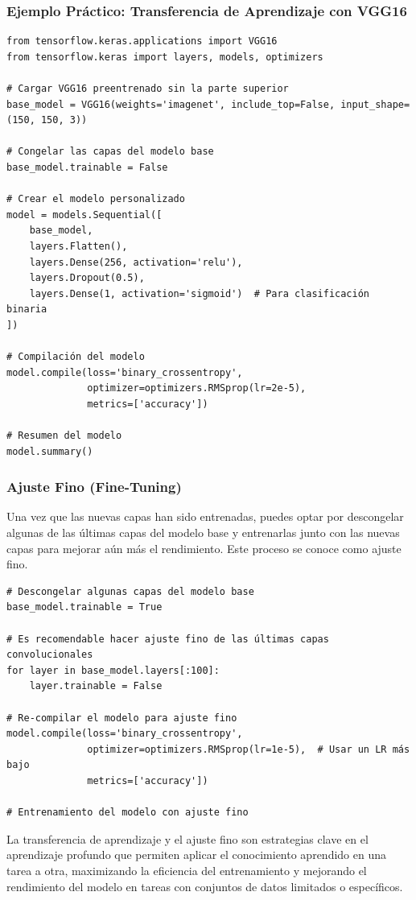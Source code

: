 \documentclass[11pt]{article}
\begin{document}
\subsubsection{Ejemplo Práctico: Transferencia de Aprendizaje con VGG16}
\label{sec:orga7b3fd8}
\begin{verbatim}
from tensorflow.keras.applications import VGG16
from tensorflow.keras import layers, models, optimizers

# Cargar VGG16 preentrenado sin la parte superior
base_model = VGG16(weights='imagenet', include_top=False, input_shape=(150, 150, 3))

# Congelar las capas del modelo base
base_model.trainable = False

# Crear el modelo personalizado
model = models.Sequential([
    base_model,
    layers.Flatten(),
    layers.Dense(256, activation='relu'),
    layers.Dropout(0.5),
    layers.Dense(1, activation='sigmoid')  # Para clasificación binaria
])

# Compilación del modelo
model.compile(loss='binary_crossentropy',
              optimizer=optimizers.RMSprop(lr=2e-5),
              metrics=['accuracy'])

# Resumen del modelo
model.summary()
\end{verbatim}

\subsubsection{Ajuste Fino (Fine-Tuning)}
\label{sec:org81d3168}
Una vez que las nuevas capas han sido entrenadas, puedes optar por
descongelar algunas de las últimas capas del modelo base y entrenarlas
junto con las nuevas capas para mejorar aún más el rendimiento. Este
proceso se conoce como ajuste fino.

\begin{verbatim}
# Descongelar algunas capas del modelo base
base_model.trainable = True

# Es recomendable hacer ajuste fino de las últimas capas convolucionales
for layer in base_model.layers[:100]:
    layer.trainable = False

# Re-compilar el modelo para ajuste fino
model.compile(loss='binary_crossentropy',
              optimizer=optimizers.RMSprop(lr=1e-5),  # Usar un LR más bajo
              metrics=['accuracy'])

# Entrenamiento del modelo con ajuste fino
\end{verbatim}

La transferencia de aprendizaje y el ajuste fino son estrategias clave
en el aprendizaje profundo que permiten aplicar el conocimiento
aprendido en una tarea a otra, maximizando la eficiencia del
entrenamiento y mejorando el rendimiento del modelo en tareas con
conjuntos de datos limitados o específicos.
\end{document}
